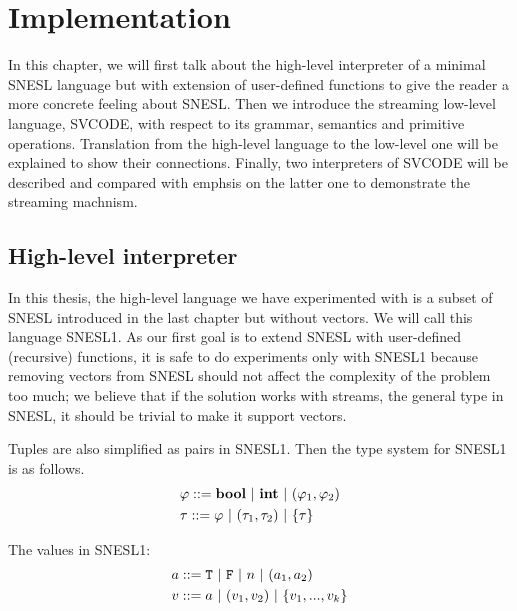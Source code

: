 \clearpage

\def\PRName#1{\textsc{Pre-#1}}
\newcommand\ra{\rightarrow}
\newcommand\vp{\varphi}
\newcommand\tr{\triangleright}
\newcommand{\proc}{\*{Proc}}
\newcommand{\bufst}{\*{BufState}}
\newcommand{\sups}{\*{Sups}}
\newcommand{\clis}{\*{Clis}}
\newcommand{\xducer}{\*{Xducer}}


\chapter{Implementation}

In this chapter, we will first talk about the high-level interpreter of a minimal SNESL language but with extension of user-defined functions to give the reader a more concrete feeling about SNESL. 
Then we introduce the streaming low-level language, SVCODE, with respect to its grammar, semantics and primitive operations.
Translation from the high-level language to the low-level one will be explained to show their connections.
Finally, two interpreters of SVCODE will be described and compared with emphsis on the latter one to demonstrate the streaming machnism.



\section{High-level interpreter}

In this thesis, the high-level language we have experimented with is a subset of SNESL introduced in the last chapter but without vectors. We will call this language SNESL1.
As our first goal is to extend SNESL with user-defined (recursive) functions,
it is safe to do experiments only with SNESL1 because removing vectors from SNESL should not affect the complexity of the problem too much; we believe that if the solution works with streams, the general type in SNESL, it should be trivial to make it support vectors. 


Tuples are also simplified as pairs in SNESL1. 
Then the type system for SNESL1 is as follows.
\begin{align*} 
& \vp ::= \bool \ | \ \int \ | \ (\vp_1,\vp_2) \\
& \tau ::= \vp \ | \ (\tau_1,\tau_2) \ | \ \tseq{\tau}  
\end{align*}

The values in SNESL1:
\begin{align*}
& a ::=  \mathtt{T} \ | \ \mathtt{F} \ | \ n  \ | \ (a_1,a_2) \\
& v ::=  a \ | \ (v_1,v_2) \ | \ \{v_1,...,v_k\} 
\end{align*}

